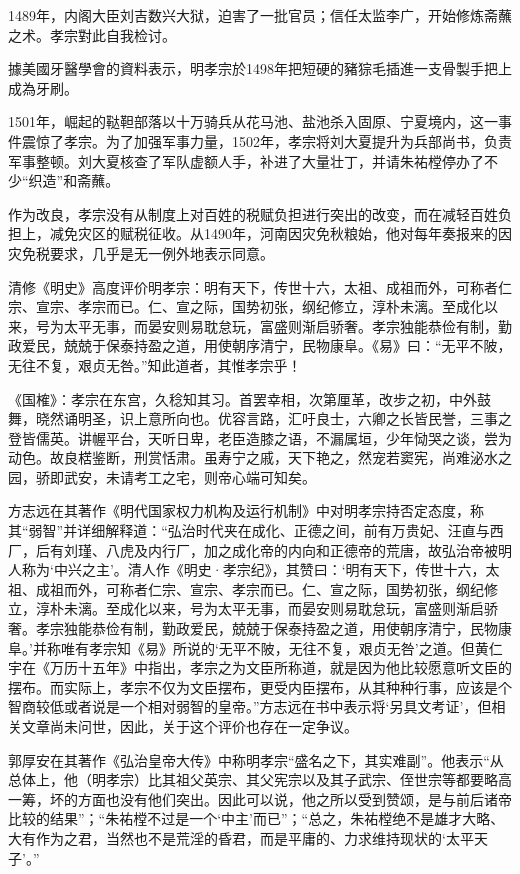 1489年，内阁大臣刘吉数兴大狱，迫害了一批官员；信任太监李广，开始修炼斋蘸之术。孝宗對此自我检讨。

據美國牙醫學會的資料表示，明孝宗於1498年把短硬的豬猔毛插進一支骨製手把上成為牙刷。

1501年，崛起的鞑靼部落以十万骑兵从花马池、盐池杀入固原、宁夏境内，这一事件震惊了孝宗。为了加强军事力量，1502年，孝宗将刘大夏提升为兵部尚书，负责军事整顿。刘大夏核查了军队虚额人手，补进了大量壮丁，并请朱祐樘停办了不少“织造”和斋蘸。

作为改良，孝宗没有从制度上对百姓的税赋负担进行突出的改变，而在减轻百姓负担上，减免灾区的赋税征收。从1490年，河南因灾免秋粮始，他对每年奏报来的因灾免税要求，几乎是无一例外地表示同意。

清修《明史》高度评价明孝宗：明有天下，传世十六，太祖、成祖而外，可称者仁宗、宣宗、孝宗而已。仁、宣之际，国势初张，纲纪修立，淳朴未漓。至成化以来，号为太平无事，而晏安则易耽怠玩，富盛则渐启骄奢。孝宗独能恭俭有制，勤政爱民，兢兢于保泰持盈之道，用使朝序清宁，民物康阜。《易》曰：“无平不陂，无往不复，艰贞无咎。”知此道者，其惟孝宗乎！

《国榷》：孝宗在东宫，久稔知其习。首罢幸相，次第厘革，改步之初，中外鼓舞，晓然诵明圣，识上意所向也。优容言路，汇吁良士，六卿之长皆民誉，三事之登皆儒英。讲幄平台，天听日卑，老臣造膝之语，不漏属垣，少年恸哭之谈，尝为动色。故良楛鉴断，刑赏恬肃。虽寿宁之戚，天下艳之，然宠若窦宪，尚难泌水之园，骄即武安，未请考工之宅，则帝心端可知矣。

方志远在其著作《明代国家权力机构及运行机制》中对明孝宗持否定态度，称其“弱智”并详细解释道：“弘治时代夹在成化、正德之间，前有万贵妃、汪直与西厂，后有刘瑾、八虎及内行厂，加之成化帝的内向和正德帝的荒唐，故弘治帝被明人称为‘中兴之主’。清人作《明史·孝宗纪》，其赞曰：‘明有天下，传世十六，太祖、成祖而外，可称者仁宗、宣宗、孝宗而已。仁、宣之际，国势初张，纲纪修立，淳朴未漓。至成化以来，号为太平无事，而晏安则易耽怠玩，富盛则渐启骄奢。孝宗独能恭俭有制，勤政爱民，兢兢于保泰持盈之道，用使朝序清宁，民物康阜。’并称唯有孝宗知《易》所说的‘无平不陂，无往不复，艰贞无咎’之道。但黄仁宇在《万历十五年》中指出，孝宗之为文臣所称道，就是因为他比较愿意听文臣的摆布。而实际上，孝宗不仅为文臣摆布，更受内臣摆布，从其种种行事，应该是个智商较低或者说是一个相对弱智的皇帝。”方志远在书中表示将‘另具文考证’，但相关文章尚未问世，因此，关于这个评价也存在一定争议。

郭厚安在其著作《弘治皇帝大传》中称明孝宗“盛名之下，其实难副”。他表示“从总体上，他（明孝宗）比其祖父英宗、其父宪宗以及其子武宗、侄世宗等都要略高一筹，坏的方面也没有他们突出。因此可以说，他之所以受到赞颂，是与前后诸帝比较的结果”；“朱祐樘不过是一个‘中主’而已”；“总之，朱祐樘绝不是雄才大略、大有作为之君，当然也不是荒淫的昏君，而是平庸的、力求维持现状的‘太平天子’。”

